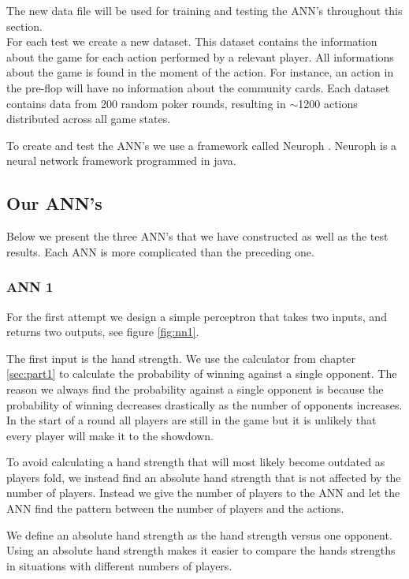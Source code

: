 The new data file will be used for training and testing the ANN's throughout this section.\\

For each test we create a new dataset. This dataset contains the information about the game for each action performed by a relevant player. All informations about the game is found in the moment of the action. For instance, an action in the pre-flop will have no information about the community cards.
Each dataset contains data from 200 random poker rounds, resulting in $\sim$1200 actions distributed across all game states.

To create and test the ANN's we use a framework called Neuroph \cite{neuroph}. Neuroph is a neural network framework programmed in java. 

\subsection{Our ANN's}
Below we present the three ANN's that we have constructed as well as the test results. Each ANN is more complicated than the preceding one.
\subsubsection{ANN 1}
\label{sec:design1}
For the first attempt we design a simple perceptron that takes two inputs, and returns two outputs, see figure \ref{fig:nn1}. 


The first input is the hand strength. We use the calculator from chapter \ref{sec:part1} to calculate the probability of winning against a single opponent. The reason we always find the probability against a single opponent is because the probability of winning decreases drastically as the number of opponents increases. In the start of a round all players are still in the game but it is unlikely that every player will make it to the showdown.

To avoid calculating a hand strength that will most likely become outdated as players fold, we instead find an absolute hand strength that is not affected by the number of players. Instead we give the number of players to the ANN and let the ANN find the pattern between the number of players and the actions.

We define an absolute hand strength as the hand strength versus one opponent. Using an absolute hand strength makes it easier to compare the hands strengths in situations with different numbers of players. \\

